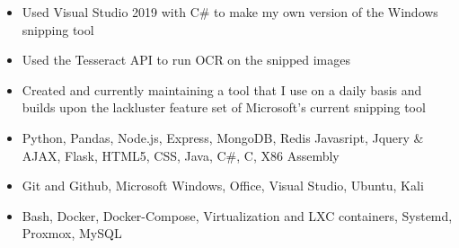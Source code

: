 \documentclass[10pt,a4paper,ragged2e]{altacv}
\begin{document}
\smallskip
\smallskip
{}
\begin{itemize}
\item Used Visual Studio 2019 with C\# to make my own version of the Windows snipping tool
\smallskip
\item Used the Tesseract API to run OCR on the snipped images
\smallskip
\item Created and currently maintaining a tool that I use on a daily basis and builds upon the lackluster feature set of Microsoft's current snipping tool
\end{itemize}
\smallskip
\smallskip
\smallskip
\smallskip
\smallskip
\smallskip
\smallskip
\smallskip
\smallskip
\smallskip
\smallskip
\smallskip
\smallskip
\smallskip


\smallskip
\begin{itemize}
\item Python, Pandas, Node.js, Express, MongoDB, Redis Javasript, Jquery \& AJAX, Flask, HTML5, CSS, Java, C\#, C, X86 Assembly
\smallskip
\item Git and Github, Microsoft Windows, Office, Visual Studio, Ubuntu, Kali
\smallskip
\item Bash, Docker, Docker-Compose, Virtualization and LXC containers, Systemd, Proxmox, MySQL
\end{itemize}


\clearpage


\nocite{*}

\end{document}
